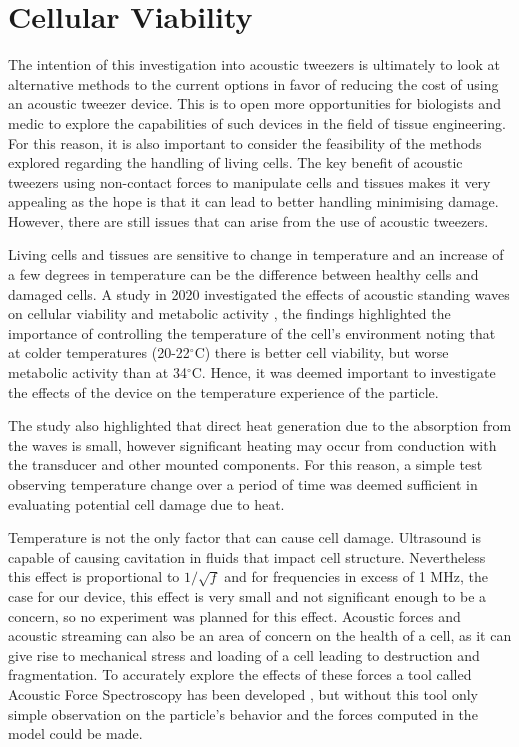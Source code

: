 \documentclass[11pt,a4paper]{article}
\begin{document}
\section{Cellular Viability}
\label{subsec:cell-viability}
The intention of this investigation into acoustic tweezers is ultimately to look at alternative methods to the current options in favor of reducing the cost of using an acoustic tweezer device. This is to open more opportunities for biologists and medic to explore the capabilities of such devices in the field of tissue engineering. For this reason, it is also important to consider the feasibility of the methods explored regarding the handling of living cells. The key benefit of acoustic tweezers using non-contact forces to manipulate cells and tissues makes it very appealing as the hope is that it can lead to better handling minimising damage. However, there are still issues that can arise from the use of acoustic tweezers.

Living cells and tissues are sensitive to change in temperature and an increase of a few degrees in temperature can be the difference between healthy cells and damaged cells. A study in 2020 investigated the effects of acoustic standing waves on cellular viability and metabolic activity \cite{Levario-Diaz2020EffectActivity}, the findings highlighted the importance of controlling the temperature of the cell's environment noting that at colder temperatures (20-22$^{\circ}$C) there is better cell viability, but worse metabolic activity than at 34$^{\circ}$C. Hence, it was deemed important to investigate the effects of the device on the temperature experience of the particle.

The study also highlighted that direct heat generation due to the absorption from the waves is small, however significant heating may occur from conduction with the transducer and other mounted components. For this reason, a simple test observing temperature change over a period of time was deemed sufficient in evaluating potential cell damage due to heat.

Temperature is not the only factor that can cause cell damage. Ultrasound is capable of causing cavitation in fluids that impact cell structure. Nevertheless this effect is proportional to ${1/\sqrt{f}}$ and for frequencies in excess of 1 MHz, the case for our device, this effect is very small and not significant enough to be a concern, so no experiment was planned for this effect. Acoustic forces and acoustic streaming can also be an area of concern on the health of a cell, as it can give rise to mechanical stress and loading of a cell leading to destruction and fragmentation. To accurately explore the effects of these forces a tool called Acoustic Force Spectroscopy has been developed \cite{Taris2024Single-CellAFS}, but without this tool only simple observation on the particle's behavior and the forces computed in the model could be made.
\end{document}
